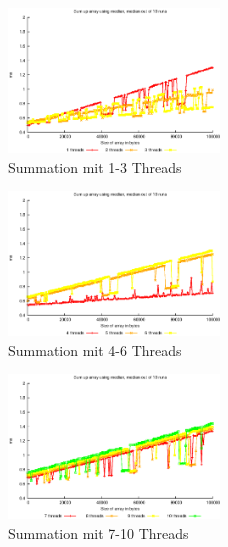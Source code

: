 \documentclass[a4paper,
12pt,
BCOR12mm,
]{scrartcl}
\begin{document}
\begin{figure}[!h]
	\begin{center}
		\includegraphics[width=0.5\textwidth]{../a_4_1/graphs/summation_median_1st}
	\end{center}
	\caption{Summation mit 1-3 Threads}
	\label{fig:summation_1_3}
\end{figure}
\begin{figure}[!h]
	\begin{center}
		\includegraphics[width=0.5\textwidth]{../a_4_1/graphs/summation_median_2nd}
	\end{center}
	\caption{Summation mit 4-6 Threads}
	\label{fig:summation_4_6}
\end{figure}
\begin{figure}[!h]
	\begin{center}
		\includegraphics[width=0.5\textwidth]{../a_4_1/graphs/summation_median_3rd}
	\end{center}
	\caption{Summation mit 7-10 Threads}
	\label{fig:summation_7_10}
\end{figure}
\end{document}
